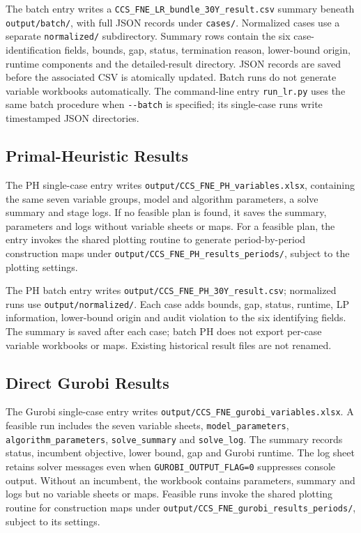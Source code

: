 \documentclass[11pt,letterpaper]{article}
\newcommand{\file}[1]{\texttt{\small\nolinkurl{#1}}}
\begin{document}
The batch entry writes a \file{CCS_FNE_LR_bundle_30Y_result.csv} summary beneath \file{output/batch/}, with full JSON records under \file{cases/}. Normalized cases use a separate \file{normalized/} subdirectory. Summary rows contain the six case-identification fields, bounds, gap, status, termination reason, lower-bound origin, runtime components and the detailed-result directory. JSON records are saved before the associated CSV is atomically updated. Batch runs do not generate variable workbooks automatically. The command-line entry \file{run_lr.py} uses the same batch procedure when \file{--batch} is specified; its single-case runs write timestamped JSON directories.

\subsection{Primal-Heuristic Results}

The PH single-case entry writes \file{output/CCS_FNE_PH_variables.xlsx}, containing the same seven variable groups, model and algorithm parameters, a solve summary and stage logs. If no feasible plan is found, it saves the summary, parameters and logs without variable sheets or maps. For a feasible plan, the entry invokes the shared plotting routine to generate period-by-period construction maps under \file{output/CCS_FNE_PH_results_periods/}, subject to the plotting settings.

The PH batch entry writes \file{output/CCS_FNE_PH_30Y_result.csv}; normalized runs use \file{output/normalized/}. Each case adds bounds, gap, status, runtime, LP information, lower-bound origin and audit violation to the six identifying fields. The summary is saved after each case; batch PH does not export per-case variable workbooks or maps. Existing historical result files are not renamed.

\subsection{Direct Gurobi Results}

The Gurobi single-case entry writes \file{output/CCS_FNE_gurobi_variables.xlsx}. A feasible run includes the seven variable sheets, \file{model_parameters}, \file{algorithm_parameters}, \file{solve_summary} and \file{solve_log}. The summary records status, incumbent objective, lower bound, gap and Gurobi runtime. The log sheet retains solver messages even when \file{GUROBI_OUTPUT_FLAG=0} suppresses console output. Without an incumbent, the workbook contains parameters, summary and logs but no variable sheets or maps. Feasible runs invoke the shared plotting routine for construction maps under \file{output/CCS_FNE_gurobi_results_periods/}, subject to its settings.
\end{document}
